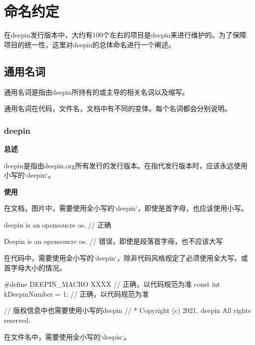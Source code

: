 \chapter{命名约定}

在deepin发行版本中，大约有100个左右的项目是deepin来进行维护的。为了保障项目的统一性，这里对deepin的总体命名进行一个阐述。

\section{通用名词} \label{general-naming-define}

通用名词是指由deepin所持有的或主导的相关名词以及缩写。

通用名词在代码，文件名，文档中有不同的变体。每个名词都会分别说明。

\subsection{deepin}

\textbf{总述}

deepin是指由deepin.org所有发行的发行版本。在指代发行版本时，应该永远使用小写的`deepin`。

\begin{DWarn}
\end{DWarn}

\textbf{使用}

在文档，图片中，需要使用全小写的`deepin`，即使是首字母，也应该使用小写。

\begin{cppcode}
  deepin is an opensoucre os.  // 正确

  Deepin is an opensoucre os.  // 错误，即使是段落首字母，也不应该大写
\end{cppcode}

在代码中，需要使用全小写的`deepin`，除非代码风格规定了必须使用全大写，或首字母大小的情况。

\begin{cppcode}
  #define DEEPIN_MACRO XXXX     // 正确，以代码规范为准
  const int kDeepinNumber = 1;  // 正确，以代码规范为准

  // 版权信息中也需要使用小写的deepin
  // * Copyright (c) 2021. deepin All rights reserved.
\end{cppcode}

在文件名中，需要使用全小写的`deepin`。

